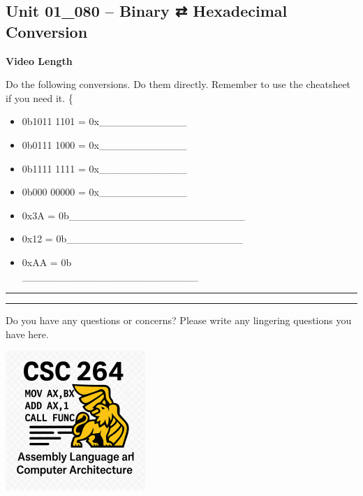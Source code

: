 \documentclass[letterpaper,12pt]{exam}
\newcommand{\unit}{Unit 01}
\begin{document}
\begin{questions}
\section*{\unit\_080 -- Binary ⇄ Hexadecimal Conversion}
\par{\selectfont\textbf{Video Length }}
\begin{samepage}
    \question Do the following conversions.  Do them directly.  Remember to use the cheatsheet if you need it.
    \{\begin{itemize}
      \item  0b1011 1101 = 0x\_\_\_\_\_\_\_\_\_\_\_\_\\
      \item  0b0111 1000 = 0x\_\_\_\_\_\_\_\_\_\_\_\_\\
      \item  0b1111 1111 = 0x\_\_\_\_\_\_\_\_\_\_\_\_\\
      \item  0b000 00000 = 0x\_\_\_\_\_\_\_\_\_\_\_\_
      \item  0x3A = 0b\_\_\_\_\_\_\_\_\_\_\_\_\_\_\_\_\_\_\_\_\_\_\_\_\\
      \item  0x12 = 0b\_\_\_\_\_\_\_\_\_\_\_\_\_\_\_\_\_\_\_\_\_\_\_\_\\
      \item  0xAA = 0b\\_\_\_\_\_\_\_\_\_\_\_\_\_\_\_\_\_\_\_\_\_\_\_\_\\
    \end{itemize}
\end{samepage}

\rule{0.5\textwidth}{.4pt} %

\begin{center}
    \rule{0.5\textwidth}{.4pt}
\end{center}
Do you have any questions or concerns? Please write any lingering questions you have here.

\end{questions}
\vfill
\begin{center}
\includegraphics{../csc264Logo}
\end{center}
\end{document}
